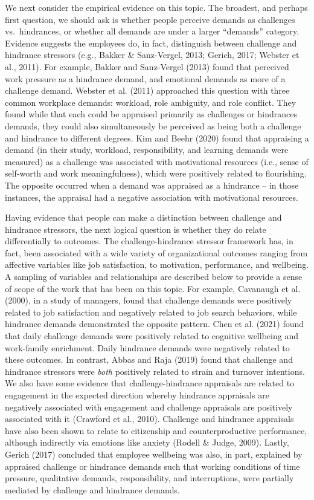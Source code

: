 \documentclass[
  english,
  man]{apa6}
\begin{document}
We next consider the empirical evidence on this topic. The broadest, and perhaps first question, we should ask is whether people perceive demands as challenges vs.~hindrances, or whether all demands are under a larger ``demands'' category. Evidence suggests the employees do, in fact, distinguish between challenge and hindrance stressors (e.g., Bakker \& Sanz-Vergel, 2013; Gerich, 2017; Webster et al., 2011). For example, Bakker and Sanz-Vergel (2013) found that perceived work pressure as a hindrance demand, and emotional demands as more of a challenge demand. Webster et al. (2011) approached this question with three common workplace demands: workload, role ambiguity, and role conflict. They found while that each could be appraised primarily as challenges or hindrances demands, they could also simultaneously be perceived as being both a challenge and hindrance to different degrees. Kim and Beehr (2020) found that appraising a demand (in their study, workload, responsibility, and learning demands were measured) as a challenge was associated with motivational resources (i.e., sense of self-worth and work meaningfulness), which were positively related to flourishing. The opposite occurred when a demand was appraised as a hindrance -- in those instances, the appraisal had a negative association with motivational resources.

Having evidence that people can make a distinction between challenge and hindrance stressors, the next logical question is whether they do relate differentially to outcomes. The challenge-hindrance stressor framework has, in fact, been associated with a wide variety of organizational outcomes ranging from affective variables like job satisfaction, to motivation, performance, and wellbeing. A sampling of variables and relationships are described below to provide a sense of scope of the work that has been on this topic. For example, Cavanaugh et al. (2000), in a study of managers, found that challenge demands were positively related to job satisfaction and negatively related to job search behaviors, while hindrance demands demonstrated the opposite pattern. Chen et al. (2021) found that daily challenge demands were positively related to cognitive wellbeing and work-family enrichment. Daily hindrance demands were negatively related to these outcomes. In contrast, Abbas and Raja (2019) found that challenge and hindrance stressors were \emph{both} positively related to strain and turnover intentions. We also have some evidence that challenge-hindrance appraisals are related to engagement in the expected direction whereby hindrance appraisals are negatively associated with engagement and challenge appraisals are positively associated with it (Crawford et al., 2010). Challenge and hindrance appraisals have also been shown to relate to citizenship and counterproductive performance, although indirectly via emotions like anxiety (Rodell \& Judge, 2009). Lastly, Gerich (2017) concluded that employee wellbeing was also, in part, explained by appraised challenge or hindrance demands such that working conditions of time pressure, qualitative demands, responsibility, and interruptions, were partially mediated by challenge and hindrance demands.
\end{document}
